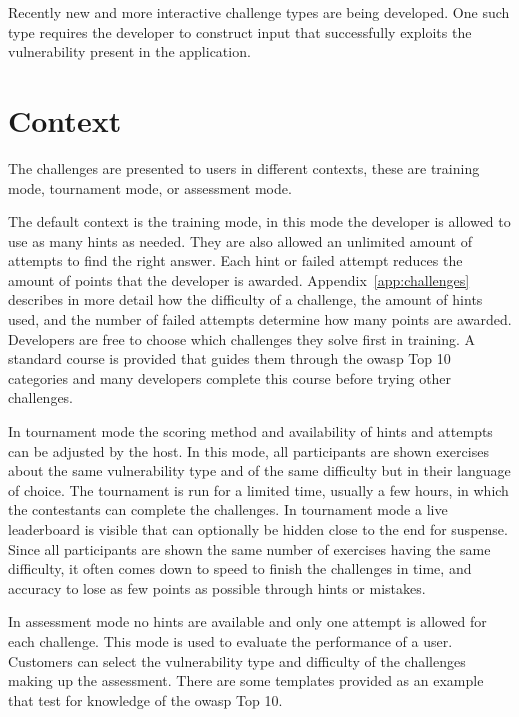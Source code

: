 Recently new and more interactive challenge types are being developed. 
One such type requires the developer to construct input that successfully exploits the vulnerability present in the application. 

\section{Context}
The challenges are presented to users in different contexts, these are training mode, tournament mode, or assessment mode.

The default context is the training mode, in this mode the developer is allowed to use as many hints as needed.
They are also allowed an unlimited amount of attempts to find the right answer.
Each hint or failed attempt reduces the amount of points that the developer is awarded.
Appendix~\ref{app:challenges} describes in more detail how the difficulty of a challenge, the amount of hints used, and the number of failed attempts determine how many points are awarded. 
Developers are free to choose which challenges they solve first in training.
A standard course is provided that guides them through the \gls{owasp} Top 10 categories and many developers complete this course before trying other challenges.

In tournament mode the scoring method and availability of hints and attempts can be adjusted by the host.
In this mode, all participants are shown exercises about the same vulnerability type and of the same difficulty but in their language of choice.
The tournament is run for a limited time, usually a few hours, in which the contestants can complete the challenges.
In tournament mode a live leaderboard is visible that can optionally be hidden close to the end for suspense.
Since all participants are shown the same number of exercises having the same difficulty, it often comes down to speed to finish the challenges in time, and accuracy to lose as few points as possible through hints or mistakes.

In assessment mode no hints are available and only one attempt is allowed for each challenge. This mode is used to evaluate the performance of a user.
Customers can select the vulnerability type and difficulty of the challenges making up the assessment.
There are some templates provided as an example that test for knowledge of the \gls{owasp} Top 10.

